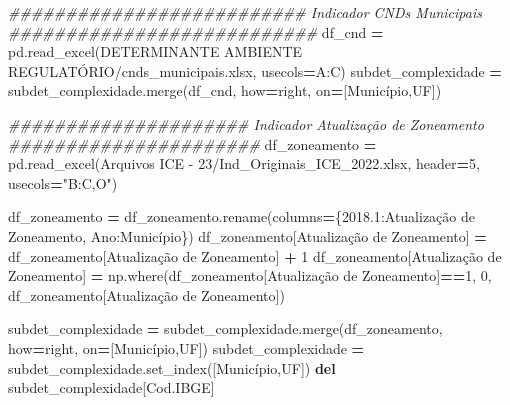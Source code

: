 \documentclass[
  12,
  dvipsnames]{article}
\newenvironment{Shaded}{\begin{snugshade}}{\end{snugshade}}
\newcommand{\CommentTok}[1]{\textcolor[rgb]{0.56,0.35,0.01}{\textit{#1}}}
\newcommand{\DecValTok}[1]{\textcolor[rgb]{0.00,0.00,0.81}{#1}}
\newcommand{\KeywordTok}[1]{\textcolor[rgb]{0.13,0.29,0.53}{\textbf{#1}}}
\newcommand{\NormalTok}[1]{#1}
\newcommand{\OperatorTok}[1]{\textcolor[rgb]{0.81,0.36,0.00}{\textbf{#1}}}
\newcommand{\StringTok}[1]{\textcolor[rgb]{0.31,0.60,0.02}{#1}}
\begin{document}
\begin{Shaded}
\begin{Highlighting}[]
\CommentTok{\#\#\#\#\#\#\#\#\#\#\#\#\#\#\#\#\#\#\#\#\#\#\#\#\#\# Indicador CNDs Municipais \#\#\#\#\#\#\#\#\#\#\#\#\#\#\#\#\#\#\#\#\#\#\#\#\#\#\#}
\NormalTok{df\_cnd }\OperatorTok{=}\NormalTok{ pd.read\_excel(}\StringTok{\textquotesingle{}DETERMINANTE AMBIENTE REGULATÓRIO/cnds\_municipais.xlsx\textquotesingle{}}\NormalTok{,}
\NormalTok{                       usecols}\OperatorTok{=}\StringTok{\textquotesingle{}A:C\textquotesingle{}}\NormalTok{)}
\NormalTok{subdet\_complexidade }\OperatorTok{=}\NormalTok{ subdet\_complexidade.merge(df\_cnd, how}\OperatorTok{=}\StringTok{\textquotesingle{}right\textquotesingle{}}\NormalTok{, on}\OperatorTok{=}\NormalTok{[}\StringTok{\textquotesingle{}Município\textquotesingle{}}\NormalTok{,}\StringTok{\textquotesingle{}UF\textquotesingle{}}\NormalTok{])}

\CommentTok{\#\#\#\#\#\#\#\#\#\#\#\#\#\#\#\#\#\#\#\#\# Indicador Atualização de Zoneamento \#\#\#\#\#\#\#\#\#\#\#\#\#\#\#\#\#\#\#\#\#\#}
\NormalTok{df\_zoneamento }\OperatorTok{=}\NormalTok{ pd.read\_excel(}\StringTok{\textquotesingle{}Arquivos ICE {-} 23/Ind\_Originais\_ICE\_2022.xlsx\textquotesingle{}}\NormalTok{, header}\OperatorTok{=}\DecValTok{5}\NormalTok{,}
\NormalTok{                        usecols}\OperatorTok{=}\StringTok{"B:C,O"}\NormalTok{)}

\NormalTok{df\_zoneamento }\OperatorTok{=}\NormalTok{ df\_zoneamento.rename(columns}\OperatorTok{=}\NormalTok{\{}\StringTok{\textquotesingle{}2018.1\textquotesingle{}}\NormalTok{:}\StringTok{\textquotesingle{}Atualização de Zoneamento\textquotesingle{}}\NormalTok{,}
                                              \StringTok{\textquotesingle{}Ano\textquotesingle{}}\NormalTok{:}\StringTok{\textquotesingle{}Município\textquotesingle{}}\NormalTok{\})}
\NormalTok{df\_zoneamento[}\StringTok{\textquotesingle{}Atualização de Zoneamento\textquotesingle{}}\NormalTok{] }\OperatorTok{=}\NormalTok{ df\_zoneamento[}\StringTok{\textquotesingle{}Atualização de Zoneamento\textquotesingle{}}\NormalTok{] }\OperatorTok{+} \DecValTok{1}
\NormalTok{df\_zoneamento[}\StringTok{\textquotesingle{}Atualização de Zoneamento\textquotesingle{}}\NormalTok{] }\OperatorTok{=}\NormalTok{ np.where(df\_zoneamento[}\StringTok{\textquotesingle{}Atualização de Zoneamento\textquotesingle{}}\NormalTok{]}\OperatorTok{==}\DecValTok{1}\NormalTok{, }\DecValTok{0}\NormalTok{, df\_zoneamento[}\StringTok{\textquotesingle{}Atualização de Zoneamento\textquotesingle{}}\NormalTok{]) }

\NormalTok{subdet\_complexidade }\OperatorTok{=}\NormalTok{ subdet\_complexidade.merge(df\_zoneamento, how}\OperatorTok{=}\StringTok{\textquotesingle{}right\textquotesingle{}}\NormalTok{, on}\OperatorTok{=}\NormalTok{[}\StringTok{\textquotesingle{}Município\textquotesingle{}}\NormalTok{,}\StringTok{\textquotesingle{}UF\textquotesingle{}}\NormalTok{])}
\NormalTok{subdet\_complexidade }\OperatorTok{=}\NormalTok{ subdet\_complexidade.set\_index([}\StringTok{\textquotesingle{}Município\textquotesingle{}}\NormalTok{,}\StringTok{\textquotesingle{}UF\textquotesingle{}}\NormalTok{])}
\KeywordTok{del}\NormalTok{ subdet\_complexidade[}\StringTok{\textquotesingle{}Cod.IBGE\textquotesingle{}}\NormalTok{]}


\end{Highlighting}
\end{Shaded}
\end{document}
